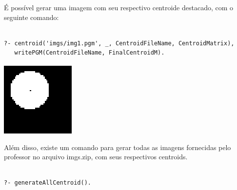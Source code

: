 \documentclass{article}
\begin{document}
É possível gerar uma imagem com seu respectivo centroide destacado, com o seguinte comando:
	
\begin{center}
\begin{minipage}{13cm}
\begin{Verbatim}

?- centroid('imgs/img1.pgm', _, CentroidFileName, CentroidMatrix), 
   writePGM(CentroidFileName, FinalCentroidM). 
\end{Verbatim}
\end{minipage}
\end{center}

\begin{center}
\includegraphics[scale=1.00]{texImgs/centroid_img1.eps}
\end{center}
	

Além disso, existe um comando para gerar todas as imagens fornecidas pelo professor no arquivo imgs.zip, com seus respectivos centroids.

\begin{center}
\begin{minipage}{13cm}
\begin{Verbatim}

?- generateAllCentroid().

\end{Verbatim}
\end{minipage}
\end{center}
\end{document}
